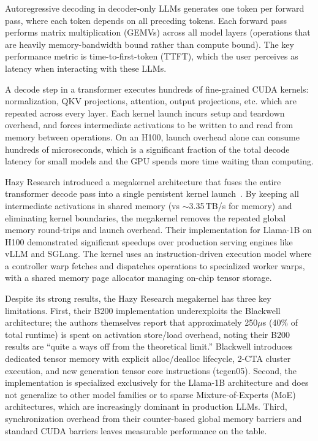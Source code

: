 \documentclass[sigplan,screen]{acmart}
\begin{document}
Autoregressive decoding in decoder-only LLMs generates one token per forward pass, where each token depends on all preceding tokens. Each forward pass performs matrix multiplication (GEMVs) across all model layers (operations that are heavily memory-bandwidth bound rather than compute bound). The key performance metric is time-to-first-token (TTFT), which the user perceives as latency when interacting with these LLMs.


A decode step in a transformer executes hundreds of fine-grained CUDA kernels: normalization, QKV projections, attention, output projections, etc. which are repeated across every layer. Each kernel launch incurs setup and teardown overhead, and forces intermediate activations to be written to and read from memory between operations. On an H100, launch overhead alone can consume hundreds of microseconds, which is a significant fraction of the total decode latency for small models and the GPU spends more time waiting than computing.


Hazy Research introduced a megakernel architecture that fuses the entire transformer decode pass into a single persistent kernel launch~\cite{hazyresearch}. By keeping all intermediate activations in shared memory (vs ${\sim}$3.35\,TB/s for memory) and eliminating kernel boundaries, the megakernel removes the repeated global memory round-trips and launch overhead. Their implementation for Llama-1B on H100 demonstrated significant speedups over production serving engines like vLLM and SGLang. The kernel uses an instruction-driven execution model where a controller warp fetches and dispatches operations to specialized worker warps, with a shared memory page allocator managing on-chip tensor storage.


Despite its strong results, the Hazy Research megakernel has three key limitations. First, their B200 implementation underexploits the Blackwell architecture; the authors themselves report that approximately 250$\mu$s (40\% of total runtime) is spent on activation store/load overhead, noting their B200 results are ``quite a ways off from the theoretical limit.'' Blackwell introduces dedicated tensor memory with explicit alloc/dealloc lifecycle, 2-CTA cluster execution, and new generation tensor core instructions (tcgen05). Second, the implementation is specialized exclusively for the Llama-1B architecture and does not generalize to other model families or to sparse Mixture-of-Experts (MoE) architectures, which are increasingly dominant in production LLMs. Third, synchronization overhead from their counter-based global memory barriers and standard CUDA barriers leaves measurable performance on the table.
\end{document}
